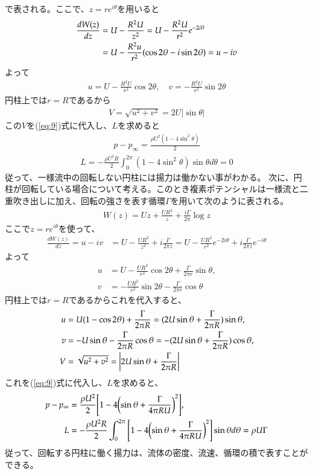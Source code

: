 \documentclass[10pt,b5paper,papersize,dvipdfmx]{jsbook}
\begin{document}
で表される。ここで、$z = re^{i\theta}$を用いると
\begin{align}
  \frac{dW(z)}{dz}
  &= U - \frac{R^2U}{z^2}
  = U - \frac{R^2U}{r^2}e^{-2i\theta} \notag \\
  &= U - \frac{R^2u}{r^2}(\cos2\theta - i\sin2\theta)
  = u - iv
\end{align}
よって
\begin{align}
  u = U - \frac{R^2U}{r^2} \cos2\theta,\quad
  v = -\frac{R^2U}{r^2} \sin2\theta
\end{align}
円柱上では$r = R$であるから
\begin{align}
  V = \sqrt{u^2+v^2}
    = 2U|\sin\theta|
\end{align}
この$V$を(\ref{eq:9})式に代入し、$L$を求めると
\begin{align}
  p - p_\infty = \frac{\rho U^2(1 - 4\sin^2\theta)}{2}
\end{align}
\begin{align}
  L = -\frac{\rho U^2R}{2} \int_0^{2\pi} (1 - 4\sin^2\theta) \sin\theta d\theta 
    = 0
\end{align}
従って、一様流中の回転しない円柱には揚力は働かない事がわかる。
次に、円柱が回転している場合について考える。このとき複素ポテンシャルは一様流と二重吹き出しに加え、回転の強さを表す循環$\Gamma$を用いて次のように表される。
\begin{align}
  W(z) = Uz + \frac{UR^2}{z} + \frac{i\Gamma}{2\pi} \log z
\end{align}
ここで$z=re^{i\theta}$を使って、
\begin{align}
  \frac{dW(z)}{dz}
  = u - iv
  &= U - \frac{UR^2}{z^2} + i\frac{\Gamma}{2\pi z}
  = U - \frac{UR^2}{r^2}e^{-2i\theta} + i\frac{\Gamma}{2\pi z}e^{-i\theta}
\end{align}
よって
\begin{align}
  u &= U - \frac{UR^2}{r^2}\cos 2\theta + \frac{\Gamma}{2\pi r}\sin\theta,\\
  v &= -\frac{UR^2}{r^2}\sin 2\theta - \frac{\Gamma}{2\pi r}\cos\theta
\end{align}
円柱上では$r = R$であるからこれを代入すると、
\begin{align}
  u &= U(1 - \cos 2\theta) + \frac{\Gamma}{2\pi R}
    = (2U\sin\theta + \frac{\Gamma}{2\pi R})\sin\theta,\\
  v &= -U\sin\theta - \frac{\Gamma}{2\pi R}\cos\theta
    = -(2U\sin\theta + \frac{\Gamma}{2\pi R})\cos\theta,\\
  V &= \sqrt{u^2 + v^2} = \qty|2U\sin\theta + \frac{\Gamma}{2\pi R}|
\end{align}
これを(\ref{eq:9})式に代入し、$L$を求めると、
\begin{align}
  p - p_\infty &= \frac{\rho U^2}{2} \qty[1 - 4\qty(\sin\theta + \frac{\Gamma}{4\pi RU})^2],\\
  L &= -\frac{\rho U^2R}{2}\int_0^{2\pi} \qty[1 - 4\qty(\sin\theta + \frac{\Gamma}{4\pi RU})^2]\sin\theta d\theta %
    = \rho U\Gamma
  \label{eq:26}
\end{align}
従って、回転する円柱に働く揚力は、流体の密度、流速、循環の積で表すことができる。
\end{document}
